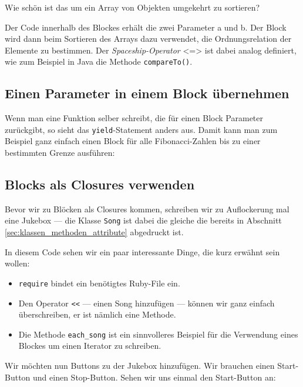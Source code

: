 \documentclass[a4book,11pt,twoside]{scrbook}
\begin{document}
Wie schön ist das um ein Array von Objekten umgekehrt zu sortieren?

Der Code innerhalb des Blockes erhält die zwei Parameter a und b. Der Block wird dann beim Sortieren des Arrays dazu verwendet, die Ordnungsrelation der Elemente zu bestimmen. Der \emph{Spaceship-Operator} <=> ist dabei analog definiert, wie zum Beispiel in Java die Methode \texttt{compareTo()}.

\subsection*{Einen Parameter in einem Block übernehmen} %
\label{sub:subsection_name}
Wenn man eine Funktion selber schreibt, die für einen Block Parameter zurückgibt, so sieht das \texttt{yield}-Statement anders aus. Damit kann man zum Beispiel ganz einfach einen Block für alle Fibonacci-Zahlen bis zu einer bestimmten Grenze ausführen:




\subsection*{Blocks als Closures verwenden} %
\label{sub:blocks_als_closures_verwenden}
Bevor wir zu Blöcken als Closures kommen, schreiben wir  zu Auflockerung mal eine Jukebox — die Klasse \texttt{Song} ist dabei die gleiche die bereits in Abschnitt \ref{sec:klassen_methoden_attribute} abgedruckt ist.



In diesem Code sehen wir ein paar interessante Dinge, die kurz erwähnt sein wollen:

\begin{itemize}
	\item \texttt{require} bindet ein benötigtes Ruby-File ein.
	\item Den Operator \texttt{<<} — einen Song hinzufügen — können wir ganz einfach überschreiben, er ist nämlich eine Methode.
	\item Die Methode \texttt{each\_song} ist ein sinnvolleres Beispiel für die Verwendung eines Blockes um einen Iterator zu schreiben.
\end{itemize}

Wir möchten nun Buttons zu der Jukebox hinzufügen. Wir brauchen einen Start-Button und einen Stop-Button. Sehen wir uns einmal den Start-Button an:
\end{document}
